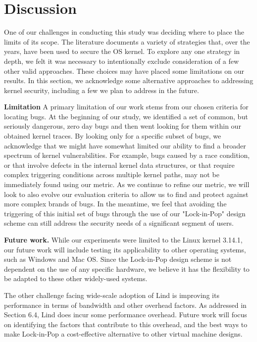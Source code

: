 \section{Discussion}
\label{sec.limitation}

One of our challenges in conducting this study was deciding where to place the
limits of its scope. The literature documents a variety of strategies that, over
the years, have been used to secure the OS kernel. To explore any one strategy
in depth, we felt it was necessary to intentionally exclude consideration of
a few other valid approaches. These choices may have placed some limitations on our results.
In this section, we acknowledge some alternative
approaches to addressing kernel security, including a few we plan
to address in the future.

\textbf{Limitation }
A primary limitation of our work stems from our chosen criteria for locating
bugs. At the beginning
of our study, we identified a set of common, but seriously dangerous, zero day bugs
and then went looking for them within our obtained kernel traces. By looking only
for a specific subset of bugs, we acknowledge that we might have somewhat limited our
ability to find a broader spectrum of kernel vulnerabilities. For example, bugs
caused by a race condition, or that involve defects in the internal kernel data
structures, or that require complex triggering conditions across multiple kernel
paths, may not be immediately found using our metric. As we continue to refine
our metric, we will look to also evolve our evaluation
criteria to allow us to find and protect against more complex brands of bugs.
In the meantime, we feel that avoiding the triggering of this initial set of bugs
through the use of our "Lock-in-Pop" design scheme can still address the security
needs of a significant segment of users.

\textbf{Future work.}
While our experiments were limited to the Linux kernel 3.14.1, our future work
will include testing its applicability to other operating systems, such as
Windows and Mac OS. Since the Lock-in-Pop design scheme is not dependent on the use of any
specific hardware, we believe it has the flexibility to be adapted to these other
widely-used systems.

The other challenge facing wide-scale adoption of Lind is improving its
performance in terms of bandwidth and other overhead factors. As addressed in
Section 6.4, Lind does incur some performance overhead. Future work will focus on identifying
the factors that contribute to this overhead, and the best ways to make Lock-in-Pop
a cost-effective alternative to other virtual machine designs.
